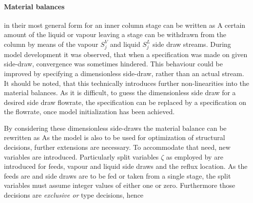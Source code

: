         \paragraph{Material balances} in their most general form for an inner column stage can be written as
        A certain amount of the liquid or vapour leaving a stage can be withdrawn from the column by means
        of the vapour $S^V_j$ and liquid $S^L_j$ side draw streams. During model development it was observed, that
        when a specification was made on given side-draw, convergence was sometimes hindered. This behaviour
        could be improved by specifying a dimensionless side-draw,
        rather than an actual stream. It should be noted, that this technically introduces further non-linearities
        into the material balances. As it is difficult, to guess the dimensionless side draw
        for a desired side draw flowrate, the specification can be replaced by a specification
        on the flowrate, once model initialization has been achieved.

        By considering these dimensionless side-draws the material balance can be rewritten as
        As the model is also to be used for optimization of structural decisions, further extensions are necessary.
        To accommodate that need, new variables are introduced. Particularly split variables $\zeta$ as employed
        by \cite{Dunnebier.1999} are introduced for feeds, vapour and liquid side draws and the reflux location.
        As the feeds are and side draws are to be fed or taken from a single stage, the split variables must assume
        integer values of either one or zero. Furthermore those decisions are \emph{exclusive or} type decisions, hence

